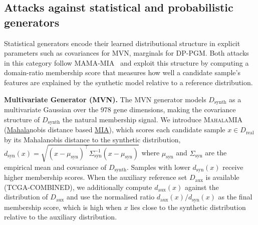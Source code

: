 \documentclass[11pt]{article}
\newcommand{\charlene}[1]{\textcolor{ForestGreen}{Charlene: #1}}
\newcommand{\steven}[1]{\textcolor{Periwinkle}{Steven: #1}}
\begin{document}
\subsection{Attacks against statistical and probabilistic generators}
Statistical generators encode their learned distributional structure in explicit parameters such as covariances for MVN, marginals for DP-PGM. Both attacks in this category follow  MAMA-MIA~\cite{golob2024privacy} and exploit this structure by computing a domain-ratio membership score that measures how well a candidate sample's features are explained by the synthetic model relative to a reference distribution.

\vspace{0.3em}
\noindent
\textbf{Multivariate Generator (MVN).} The MVN generator models $D_{\text{synth}}$ as a multivariate Gaussian over the 978 gene dimensions, making the covariance structure of $D_{\text{synth}}$ the natural membership signal. We introduce \textsc{MahalaMIA} (\ul{Mahala}nobis distance based \ul{MIA}), which scores each candidate sample $x \in D_{\text{real}}$ by its Mahalanobis distance to the synthetic distribution,
$d_{\text{syn}}(x) = \sqrt{(x - \mu_{\text{syn}})^\top \Sigma_{\text{syn}}^{-1} (x - \mu_{\text{syn}})}$
where $\mu_{\text{syn}}$ and $\Sigma_{\text{syn}}$ are the empirical mean and covariance of $D_{\text{synth}}$. Samples with lower $d_{\text{syn}}(x)$ receive higher membership scores. When the auxiliary reference set $D_{\text{aux}}$ is available (TCGA-COMBINED), we additionally compute $d_{\text{aux}}(x)$ against the distribution of $D_{\text{aux}}$ and use the normalised ratio $d_{\text{aux}}(x)/d_{\text{syn}}(x)$ as the final membership score, which is high when $x$ lies close to the synthetic distribution relative to the auxiliary distribution.


\end{document}
